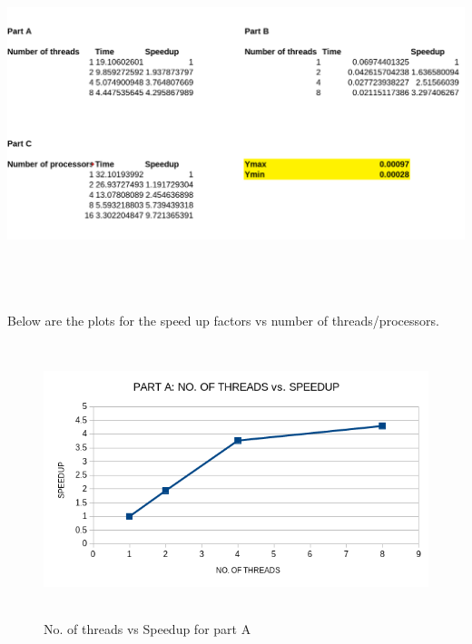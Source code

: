 \documentclass[12pt]{article}
\begin{document}
  
   \includegraphics[height = 100mm, width = 158mm]{large.png}

   

   \noindent
   Below are the plots for the speed up factors vs number of threads/processors. 

   \begin{figure}[H]
        \hfill\includegraphics[width=150mm,height= 80mm]{partAplot.png}\hspace*{\fill}
        \caption{No. of threads vs Speedup for part A}
    \end{figure}
\end{document}
